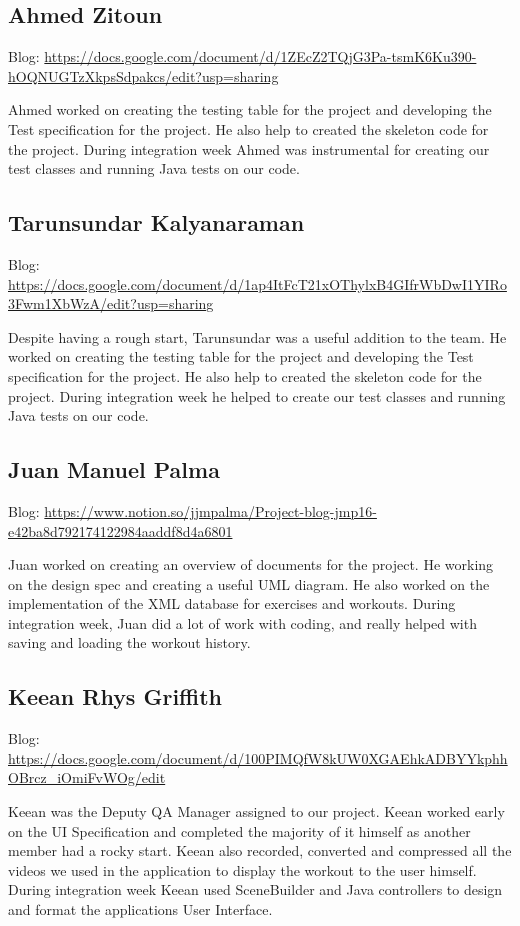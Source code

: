 \documentclass[10pt,a4paper]{article}
\begin{document}
	\subsection{Ahmed Zitoun}
	Blog: \url{https://docs.google.com/document/d/1ZEcZ2TQjG3Pa-tsmK6Ku390-hOQNUGTzXkpsSdpakcs/edit?usp=sharing}
	\par 
	Ahmed worked on creating the testing table for the project and developing the Test specification for the project. He also help to created the skeleton code for the project. During integration week Ahmed was instrumental for creating our test classes and running Java tests on our code. 
	\subsection{Tarunsundar Kalyanaraman}
	Blog: \url{https://docs.google.com/document/d/1ap4ItFcT21xOThylxB4GIfrWbDwI1YIRo3Fwm1XbWzA/edit?usp=sharing}
	\par 
	Despite having a rough start, Tarunsundar was a useful addition to the team. He worked on creating the testing table for the project and developing the Test specification for the project. He also help to created the skeleton code for the project. During integration week he helped to create our test classes and running Java tests on our code. 
	\subsection{Juan Manuel Palma}
	Blog: \url{https://www.notion.so/jjmpalma/Project-blog-jmp16-e42ba8d792174122984aaddf8d4a6801}
	\par 
	Juan worked on creating an overview of documents for the project. He working on the design spec and creating a useful UML diagram. He also worked on the implementation of the XML database for exercises and workouts. During integration week, Juan did a lot of work with coding, and really helped with saving and loading the workout history.
	\subsection{Keean Rhys Griffith}
	Blog: \url{https://docs.google.com/document/d/100PIMQfW8kUW0XGAEhkADBYYkphhOBrcz_iOmiFvWOg/edit}
	\par
	Keean was the Deputy QA Manager assigned to our project. Keean worked early on the UI Specification and completed the majority of it himself as another member had a rocky start. Keean also recorded, converted and compressed all the videos we used in the application to display the workout to the user himself. During integration week Keean used SceneBuilder and Java controllers to design and format the applications User Interface.
\end{document}
